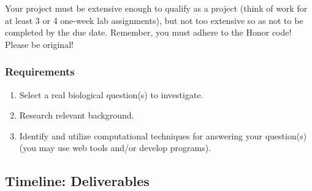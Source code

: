 Your project must be extensive enough to qualify as a project (think of work for at least 3 or 4 one-week lab assignments), but not too extensive so as not to be completed by the due date. Remember, you must adhere to the Honor code! Please be original!


\vspace*{-.1in}
\subsubsection*{Requirements}
\vspace*{-.1in}

\begin{enumerate}
	\item Select a real biological question(s) to investigate.
	\item Research relevant background.
	\item Identify and utilize computational techniques for answering your question(s) (you may use web tools and/or develop programs).
\end{enumerate}

\vspace*{-.1in}
\subsection*{Timeline: Deliverables}
\vspace*{-.1in}

